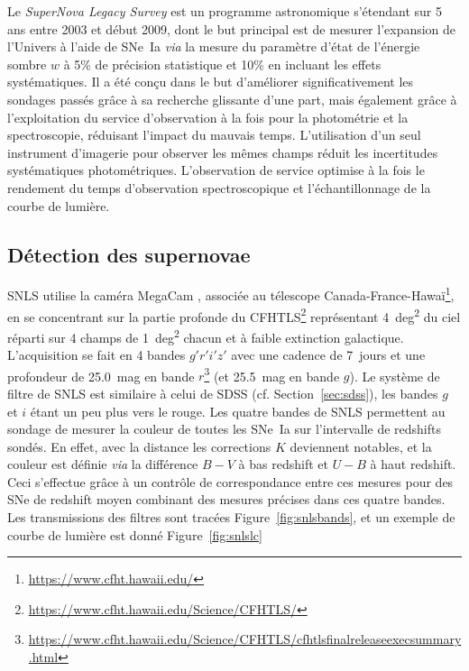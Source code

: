 \documentclass[../main/main.tex]{subfiles}
\begin{document}
Le \textit{SuperNova Legacy Survey} \citep[SNLS,][]{astier2006, sullivan2011}
est un programme astronomique s'étendant sur 5 ans entre 2003 et début 2009,
dont le but principal est de mesurer l'expansion de l'Univers à l'aide de SNe~Ia
\textit{via} la mesure du paramètre d'état de l'énergie sombre $w$ à 5\% de
précision statistique et 10\% en incluant les effets systématiques. Il a été
conçu dans le but d'améliorer significativement les sondages passés grâce à sa
recherche glissante d'une part, mais également grâce à l'exploitation du service
d'observation à la fois pour la photométrie et la spectroscopie, réduisant
l'impact du mauvais temps. L'utilisation d'un seul instrument d'imagerie pour
observer les mêmes champs réduit les incertitudes systématiques photométriques.
L'observation de service optimise à la fois le rendement du temps d'observation
spectroscopique et l'échantillonnage de la courbe de lumière.

\subsection{Détection des supernovae}\label{ssec:snlsdetec}

SNLS utilise la caméra MegaCam \citep{boulade2003}, associée au télescope
Canada-France-Hawaï\footnote{\href{https://www.cfht.hawaii.edu/}
{https://www.cfht.hawaii.edu/}}, en se concentrant sur la partie profonde du
CFHTLS\footnote{\href{https://www.cfht.hawaii.edu/Science/CFHTLS/}
{https://www.cfht.hawaii.edu/Science/CFHTLS/}} représentant \SI{4}{deg^2} du
ciel réparti sur 4 champs de \SI{1}{deg^2} chacun et à faible extinction
galactique. L'acquisition se fait en 4 bandes $g'r'i'z'$ avec une cadence de
\SI{7}{jours} et une profondeur de \SI{25,0}{mag} en bande
$r$\footnote{\href{https://www.cfht.hawaii.edu/Science/CFHTLS/cfhtlsfinalreleaseexecsummary.html}
{https://www.cfht.hawaii.edu/Science/CFHTLS/cfhtlsfinalreleaseexecsummary.html}}
(et \SI{25,5}{mag} en bande $g$). Le système de filtre de SNLS est similaire à
celui de SDSS (cf. Section~\ref{sec:sdss}), les bandes $g$ et $i$ étant un peu
plus vers le rouge. Les quatre bandes de SNLS permettent au sondage de mesurer
la couleur de toutes les SNe~Ia sur l'intervalle de redshifts sondés. En effet,
avec la distance les corrections $K$ deviennent notables, et la couleur est
définie \textit{via} la différence $B-V$ à bas redshift et $U-B$ à haut
redshift. Ceci s'effectue grâce à un contrôle de correspondance entre ces
mesures pour des SNe de redshift moyen combinant des mesures précises dans ces
quatre bandes. Les transmissions des filtres sont tracées
Figure~\ref{fig:snlsbands}, et un exemple de courbe de lumière est donné
Figure~\ref{fig:snlslc}
\end{document}
